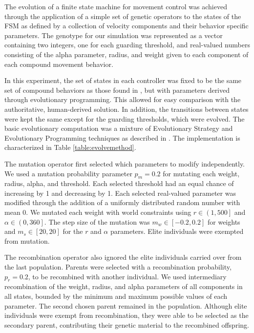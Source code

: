\documentclass[conference,final]{IEEEtran}
\begin{document}
The evolution of a finite state machine for movement control was achieved through the application of a simple set of genetic operators to the states of the FSM as defined by a collection of velocity components and their behavior specific parameters. The genotype for our simulation was represented as a vector containing two integers, one for each guarding threshold, and real-valued numbers consisting of the alpha parameter, radius, and weight given to each component of each compound movement behavior.

In this experiment, the set of states in each controller was fixed to be the same set of compound behaviors as those found in \cite{rodriguez2004extending}, but with parameters derived through evolutionary programming. This allowed for easy comparison with the authoritative, human-derived solution. In addition, the transitions between states were kept the same except for the guarding thresholds, which were evolved. The basic evolutionary computation was a mixture of Evolutionary Strategy and Evolutionary Programming techniques as described in \cite{eiben2003introduction}. The implementation is characterized in Table \ref{table:evolvemethod}. 

The mutation operator first selected which parameters to modify independently. We used a mutation probability parameter $p_m=0.2$  for mutating each weight, radius, alpha, and threshold. Each selected threshold had an equal chance of increasing by 1 and decreasing by 1. Each selected real-valued parameter was modified through the addition of a uniformly distributed random number with mean 0. We mutated each weight with world constraints using $r\in\left(1,500\right]$ and $\alpha\in\left(0,360\right]$. The step size of the mutation was $m_w\in\left[-0.2,0.2\right]$ for weights and $m_s\in\left[20,20\right]$ for the $r$ and $\alpha$ parameters. Elite individuals were exempted from mutation.

The recombination operator also ignored the elite individuals carried over from the last population. Parents were selected with a recombination probability, $p_r=0.2$, to be recombined with another individual. We used intermediary recombination of the weight, radius, and alpha parameters of all components in all states, bounded by the minimum and maximum possible values of each parameter. The second chosen parent remained in the population. Although elite individuals were exempt from recombination, they were able to be selected as the secondary parent, contributing their genetic material to the recombined offspring.
\end{document}

